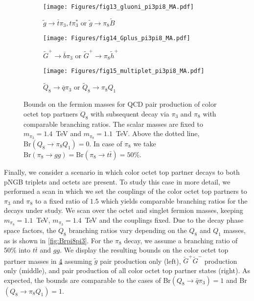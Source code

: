 \documentclass[preprintnumbers,nofootinbib,showpacs,eqsecnum,pre,12pt]{revtex4-1}
\begin{document}
\begin{figure}
	\centering
	\captionsetup[subfigure]{justification=centering}
	\begin{subfigure}[]{0.31\linewidth}
		\centering
		\texttt{[image: Figures/fig13\_gluoni\_pi3pi8\_MA.pdf]} 
		\caption{$\tilde g\to \bar t\pi_3,t \pi_3^*$ or $\tilde g\to \pi_8 \tilde B$}\label{fig:fig13_gluoni_pi3pi8_MA}
	\end{subfigure}
	\begin{subfigure}[]{0.31\linewidth}
		\centering
		\texttt{[image: Figures/fig14\_Gplus\_pi3pi8\_MA.pdf]} 
		\caption{$\tilde G^+\to \bar b\pi_3$ or $\tilde G^+\to \pi_8\tilde h^+$} \label{fig:fig14_Gplus_pi3pi8_MA}
	\end{subfigure}
	\begin{subfigure}[]{0.31\linewidth}
		\centering
		\texttt{[image: Figures/fig15\_multiplet\_pi3pi8\_MA.pdf]} 
		\caption{$\tilde Q_8\to \bar q\pi_3$ or $\tilde Q_8\to \pi_8Q_1$}\label{fig:fig15_multiplet_pi3pi8_MA}
	\end{subfigure}
	\caption{Bounds on the fermion masses for QCD pair production of color octet top partners $Q_8$ with subsequent decay via $\pi_3$ and $\pi_8$ with comparable branching ratios. The scalar masses are fixed to $m_{\pi_3}=1.4$~TeV and $m_{\pi_8}=1.1$~TeV.
	Above the dotted line, $\mathrm{Br}(Q_8\to \pi_8 Q_1)=0$.
	In case of $\pi_8$ we take $\mathrm{Br}(\pi_8\to gg)=\mathrm{Br}(\pi_8\to t\bar t)=50\%$.}
	\label{fig:bounds_mixed}
\end{figure}

Finally, we consider a scenario in which color octet top partner decays to both pNGB triplets and octets are present. 
To study this case in more detail, we performed a scan in which we set the couplings of the color octet top partners to $\pi_3$ and $\pi_8$ to a fixed ratio of $1.5$ which yields comparable branching ratios for the decays under study.  We scan over the octet and singlet fermion masses, keeping $m_{\pi_8}= 1.1$~TeV, $m_{\pi_3}= 1.4$~TeV and the couplings fixed. Due to the decay phase space factors, the $Q_8$ branching ratios vary depending on the $Q_8$ and $Q_1$ masses, as is shown in  \cref{fig:Brpi8pi3}. For the $\pi_8$ decay, we assume a branching ratio of 50\% into $t\bar{t}$ and $gg$. 
We display the resulting bounds on the color octet top partner masses in \cref{fig:bounds_mixed} assuming $\tilde g$ pair production only (left), $\tilde G^+ \tilde G^-$ production only (middle), and pair production of all color octet top partner states (right).
As expected, the bounds are comparable to the cases of Br$(Q_8 \rightarrow \bar{q} \pi_3)=1$ and Br$(Q_8 \rightarrow \pi_8 Q_1)=1$.
\end{document}
